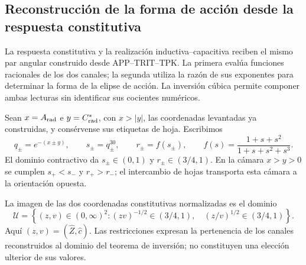 \subsection{Reconstrucción de la forma de acción desde la respuesta constitutiva}
\label{iii:subsec:puente-forma-LC}

La respuesta constitutiva y la realización inductiva--capacitiva reciben
el mismo par angular construido desde APP--TRIT--TPK. La primera evalúa
funciones racionales de los dos canales; la segunda utiliza la razón de
sus exponentes para determinar la forma de la elipse de acción. La
inversión cúbica permite componer ambas lecturas sin identificar sus
cocientes numéricos.

Sean $x=A_{\rm rad}$ e $y=C^*_{\rm rad}$, con $x>|y|$, las coordenadas
levantadas ya construidas, y consérvense sus etiquetas de hoja. Escribimos
\begin{equation}
 q_\pm=e^{-(x\pm y)},\qquad s_\pm=q_\pm^{30},\qquad
 r_\pm=f(s_\pm),\qquad
 f(s)=\frac{1+s+s^2}{1+s+s^2+s^3}.
 \label{iii:eq:forma-canales}
\end{equation}
El dominio contractivo da $s_\pm\in(0,1)$ y
$r_\pm\in(3/4,1)$. En la cámara $x>y>0$ se cumplen
$s_+<s_-$ y $r_+>r_-$; el intercambio de hojas transporta esta cámara
a la orientación opuesta.

La imagen de las dos coordenadas constitutivas normalizadas es el dominio
\begin{equation}
 \mathcal U=\left\{(z,v)\in(0,\infty)^2:
   (zv)^{-1/2}\in(3/4,1),\quad
   (z/v)^{1/2}\in(3/4,1)\right\}.
 \label{iii:eq:forma-dominio}
\end{equation}
Aquí $(z,v)=(\widehat Z,\widehat c)$. Las restricciones expresan la
pertenencia de los canales reconstruidos al dominio del teorema de
inversión; no constituyen una elección ulterior de sus valores.

